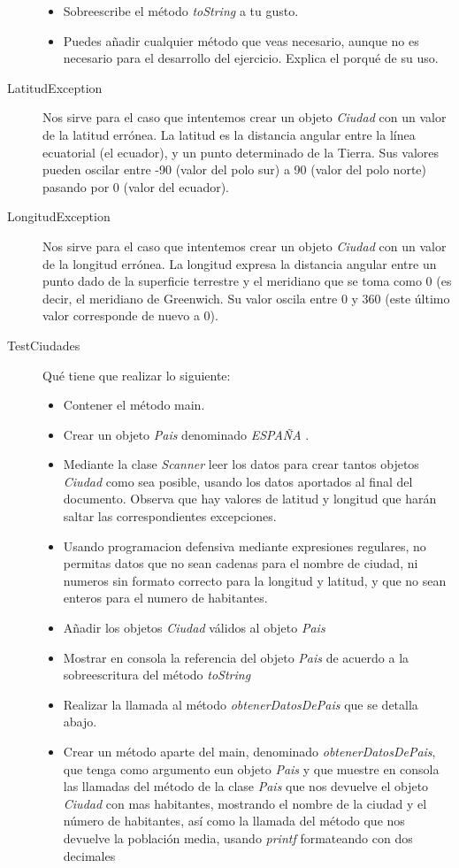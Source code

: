 \documentclass[addpoints,12pt]{exam}
\begin{document}
\begin{questions}
\begin{description}
\begin{itemize}
\item Sobreescribe el método \emph{toString} a tu gusto.
\item Puedes añadir cualquier método que veas necesario, aunque no es necesario para el desarrollo del ejercicio. Explica el porqué de su uso.
\end{itemize}
\item[LatitudException] Nos sirve para el caso que intentemos crear un objeto \emph{Ciudad} con un valor de la latitud errónea. La latitud es la distancia angular entre la línea ecuatorial (el ecuador), y un punto determinado de la Tierra. Sus valores pueden oscilar entre -90 (valor del polo sur) a 90 (valor del polo norte) pasando por 0 (valor del ecuador).
\item[LongitudException] Nos sirve para el caso que intentemos crear un objeto \emph{Ciudad} con un valor de la longitud errónea. La longitud expresa la distancia angular entre un punto dado de la superficie terrestre y el meridiano que se toma como 0 (es decir, el meridiano de Greenwich. Su valor oscila entre 0 y 360 (este último valor corresponde de nuevo a 0).
\item[TestCiudades] Qué tiene que realizar lo siguiente:
\begin{itemize}
\item Contener el método main.
\item Crear un objeto \emph{Pais} denominado \emph{ESPAÑA	}.
\item Mediante la clase \emph{Scanner} leer los datos para crear tantos objetos \emph{Ciudad} como sea posible, usando los datos aportados al final del documento. Observa que hay valores de latitud y longitud que harán saltar las correspondientes excepciones.
\item Usando programacion defensiva mediante expresiones regulares, no permitas datos que no sean cadenas para el nombre de ciudad, ni numeros sin formato correcto para la longitud y latitud, y que no sean enteros para el numero de habitantes.
\item Añadir los objetos \emph{Ciudad} válidos al objeto \emph{Pais}
\item Mostrar en consola la referencia del objeto \emph{Pais} de acuerdo a la sobreescritura del método \emph{toString}
\item Realizar la llamada al método \emph{obtenerDatosDePais} que se detalla abajo.
\item Crear un método aparte del main, denominado \emph{obtenerDatosDePais}, que tenga como argumento eun objeto \emph{Pais} y que muestre en consola las llamadas del  método de la clase \emph{Pais} que nos devuelve el objeto \emph{Ciudad} con mas habitantes, mostrando el nombre de la ciudad y el número de habitantes, así como la llamada del método que nos devuelve la población media, usando \emph{printf} formateando con dos decimales

\end{itemize}
\end{description}
\end{questions}
\end{document}
